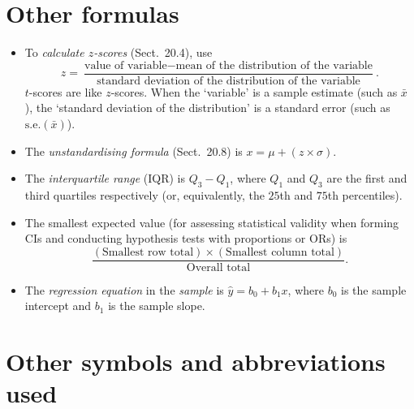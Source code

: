 \documentclass[
  11pt,
  a4paper,
  krantz2]{krantz}
\providecommand{\tightlist}{%
  \setlength{\itemsep}{0pt}\setlength{\parskip}{0pt}}
\begin{document}
\section{Other formulas}\label{FormulasOther}

\begin{itemize}
\tightlist
\item
  To \emph{calculate \(z\)-scores} (Sect.~20.4), use\\
  \[
   z = \frac{\text{value of variable} - \text{mean of the distribution of the variable}}{\text{standard deviation of the distribution of the variable}}.
  \]
  \(t\)-scores are like \(z\)-scores.
  When the `variable' is a sample estimate (such as \(\bar{x}\)), the `standard deviation of the distribution' is a standard error (such as \(\text{s.e.}(\bar{x})\)).
\item
  The \emph{unstandardising formula} (Sect.~20.8) is \(x = \mu + (z\times \sigma)\).
\item
  The \emph{interquartile range} (IQR) is \(Q_3 - Q_1\), where \(Q_1\) and \(Q_3\) are the first and third quartiles respectively (or, equivalently, the \(25\)th and \(75\)th percentiles).
\item
  The smallest expected value (for assessing statistical validity when forming CIs and conducting hypothesis tests with proportions or ORs) is\\
  \[
  \frac{(\text{Smallest row total})\times(\text{Smallest column total})}{\text{Overall total}}.
  \]
\item
  The \emph{regression equation} in the \emph{sample} is \(\hat{y} = b_0 + b_1 x\), where \(b_0\) is the sample intercept and \(b_1\) is the sample slope.
\end{itemize}

\section{Other symbols and abbreviations used}\label{OtherSymbols}
\end{document}
